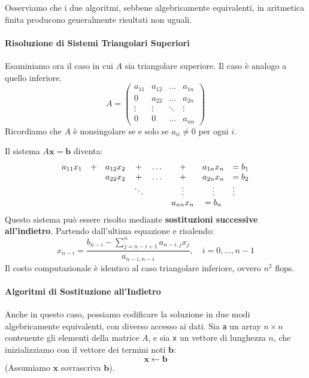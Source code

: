 \begin{osservazione}
    Osserviamo che i due algoritmi, sebbene algebricamente equivalenti, in aritmetica finita producono generalmente risultati non uguali.
    \end{osservazione}


\paragraph{Risoluzione di Sistemi Triangolari Superiori}
Esaminiamo ora il caso in cui $A$ sia triangolare superiore. Il caso è analogo a quello inferiore.
\[ A = 
\begin{pmatrix}
    a_{11} & a_{12} & \dots & a_{1n} \\
    0 & a_{22} & \dots & a_{2n} \\
    \vdots & \vdots & \ddots & \vdots \\
    0 & 0 & \dots & a_{nn}
\end{pmatrix}
\]
Ricordiamo che $A$ è nonsingolare se e solo se $a_{ii} \neq 0$ per ogni $i$.

Il sistema $A\mathbf{x} = \mathbf{b}$ diventa:
\[
\begin{array}{r c c c c c c l}
a_{11}x_1 & + & a_{12}x_2 & + & \dots & + & a_{1n}x_n & = b_1 \\
          &   & a_{22}x_2 & + & \dots & + & a_{2n}x_n & = b_2 \\
          &   &           & \ddots &       & \vdots   & \vdots & \vdots \\
          &   &           &        &       & a_{nn}x_n & = b_n
\end{array}
\]
Questo sistema può essere risolto mediante \textbf{sostituzioni successive all'indietro}. Partendo dall'ultima equazione e risalendo:
$$ x_{n-i} = \frac{b_{n-i} - \sum_{j=n-i+1}^n a_{n-i, j} x_j}{a_{n-i, n-i}}, \quad i=0, \dots, n-1 $$
Il costo computazionale è identico al caso triangolare inferiore, ovvero $n^2$ flops.

\paragraph{Algoritmi di Sostituzione all'Indietro}
Anche in questo caso, possiamo codificare la soluzione in due modi algebricamente equivalenti, con diverso accesso ai dati. 
Sia \texttt{a} un array $n \times n$ contenente gli elementi della matrice $A$, e sia \texttt{x} un vettore di lunghezza $n$, che inizializziamo con il vettore dei termini noti $\mathbf{b}$:
\[ \mathbf{x} \leftarrow \mathbf{b} \]
(Assumiamo $\mathbf{x}$ sovrascriva $\mathbf{b}$).

